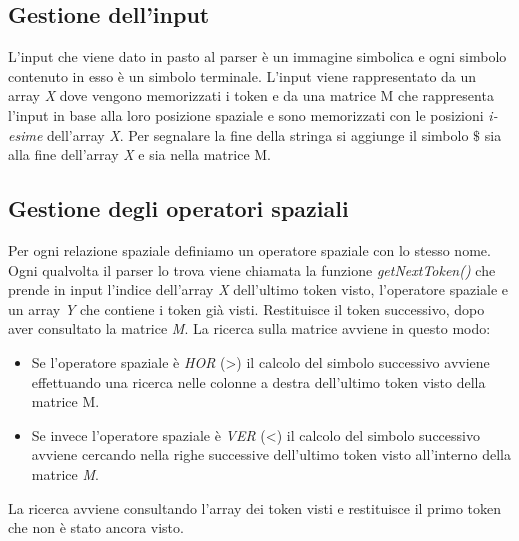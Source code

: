 \subsection{Gestione dell'input}
L'input che viene dato in pasto al parser è un immagine simbolica e ogni simbolo contenuto in esso è un simbolo terminale. L'input viene rappresentato da un array \textit{X} dove vengono memorizzati i token e da una matrice M che rappresenta l'input in base alla loro posizione spaziale e sono memorizzati con le posizioni \textit{i-esime} dell'array \textit{X}. Per segnalare la fine della stringa si aggiunge il simbolo $\$$ sia alla fine dell'array \textit{X} e sia nella matrice M.
\subsection{Gestione degli operatori spaziali}
Per ogni relazione spaziale definiamo un operatore spaziale con lo stesso nome. Ogni qualvolta il parser lo trova viene chiamata la funzione \textit{getNextToken()} che prende in input l'indice dell'array \textit{X} dell'ultimo token visto, l'operatore spaziale e un array \textit{Y} che contiene i token già visti. Restituisce il token successivo, dopo aver consultato la matrice \textit{M}. La ricerca sulla matrice avviene in questo modo:
\begin{itemize}
	\item Se l'operatore spaziale è \textit{HOR} (>) il calcolo del simbolo successivo avviene effettuando una ricerca nelle colonne a destra dell'ultimo token visto della matrice M.
	\item Se invece l'operatore spaziale è \textit{VER} (<) il calcolo del simbolo successivo avviene cercando nella righe successive dell'ultimo token visto all'interno della matrice \textit{M}.
\end{itemize}
La ricerca avviene consultando l'array dei token visti e restituisce il primo token che non è stato ancora visto.